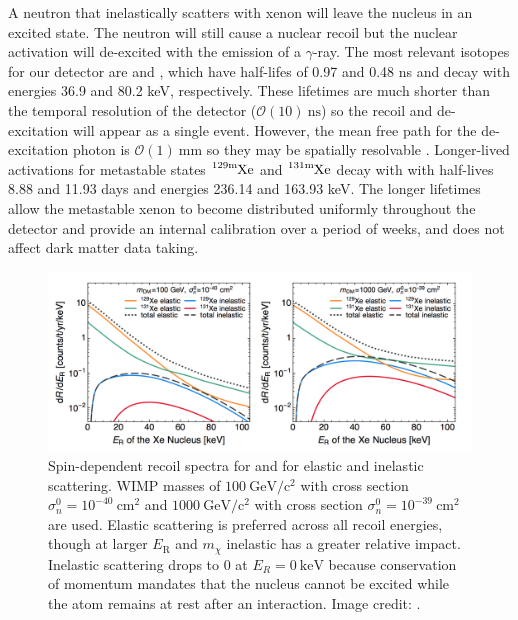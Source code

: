 A neutron that inelastically scatters with xenon will leave the nucleus in an excited state.  The neutron will still cause a nuclear
recoil but the nuclear activation will de-excited with the emission of a $\gamma$-ray.  The most relevant isotopes for our detector are
 and ,
which have half-lifes of 0.97 and 0.48 ns and decay with energies 36.9 and 80.2 keV, respectively.  These lifetimes are much shorter
than the temporal resolution of the detector ($\mathcal{O}(10)\ \mathrm{ns}$) so the recoil and de-excitation will appear as a single
event.  However, the mean free path for the de-excitation photon is $\mathcal{O}(1)\ \mathrm{mm}$ so they may be spatially
resolvable .  Longer-lived activations for metastable
states $\ce{^{129\mathrm{m}}Xe}$ and $\ce{^{131\mathrm{m}}Xe}$ decay with with half-lives 8.88 and 11.93 days and energies 236.14 and
163.93 keV.  The
longer lifetimes allow the metastable xenon to become distributed uniformly throughout the detector and provide an internal calibration
over a period of weeks, and does not affect dark matter data taking.

\begin{figure}
\includegraphics[width=\textwidth]{ElasticInelasticRates}
\caption[Spin-dependent recoil spectra for  and  for elastic and inelastic scattering of $100$ and
$1000\ \mathrm{GeV/c^2}$ WIMPs.  The WIMPs have $\sigma_{n}^{0} = 10^{-40}$ and $10^{-39}\ \mathrm{cm^2}$, respectively.]{Spin-dependent
recoil spectra for  and  for elastic and inelastic scattering.  WIMP masses
of $100\ \mathrm{GeV/c^2}$ with cross section $\sigma_{n}^{0} = 10^{-40}\ \mathrm{cm^{2}}$
and $1000\ \mathrm{GeV/c^2}$ with cross section $\sigma_{n}^{0} = 10^{-39}\ \mathrm{cm^{2}}$ are used.  Elastic scattering
is preferred across all recoil energies, though at larger $E_{\mathrm{R}}$ and $m_{\chi}$ inelastic has a greater relative
impact.  Inelastic scattering drops to 0 at 
$E_{R} = 0\ \mathrm{keV}$ because conservation of momentum mandates that the nucleus cannot be excited while the atom remains at rest
after an interaction.  Image credit: .}
\label{fig:nr_elastic_inelastic}
\end{figure}

